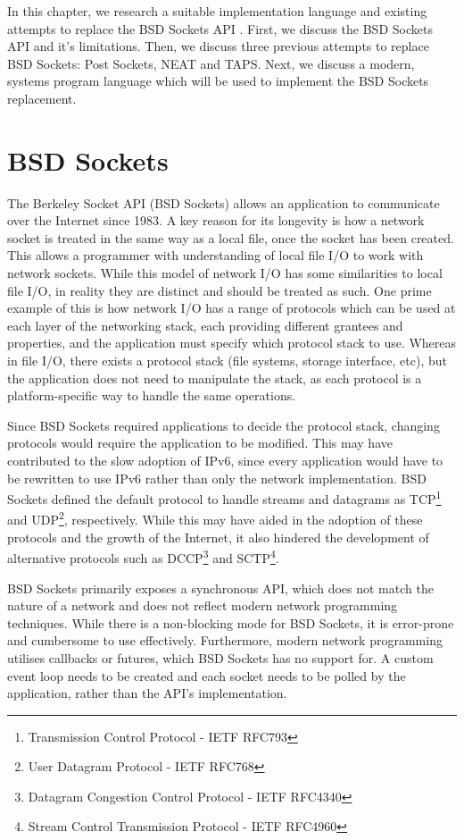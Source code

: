 In this chapter, we research a suitable implementation language and existing attempts to replace the BSD Sockets API .
First, we discuss the BSD Sockets API and it's limitations.
Then, we discuss three previous attempts to replace BSD Sockets: Post Sockets, NEAT and TAPS.
Next, we discuss a modern, systems program language which will be used to implement the BSD Sockets replacement.

\section{BSD Sockets}\label{sec:bsd-sockets}
The Berkeley Socket API (BSD Sockets) allows an application to communicate over the Internet since 1983.
A key reason for its longevity is how a network socket is treated in the same way as a local file, once the socket has
been created.
This allows a programmer with understanding of local file I/O to work with network sockets.
While this model of network I/O has some similarities to local file I/O, in reality they are distinct and should be
treated as such.
One prime example of this is how network I/O has a range of protocols which can be used at each layer of the networking
stack, each providing different grantees and properties, and the application must specify which protocol stack to use.
Whereas in file I/O, there exists a protocol stack (file systems, storage interface, etc), but the application does not
need to manipulate the stack, as each protocol is a platform-specific way to handle the same operations.

Since BSD Sockets required applications to decide the protocol stack, changing protocols would require the application
to be modified.
This may have contributed to the slow adoption of IPv6, since every application would have to be rewritten to use IPv6
rather than only the network implementation.
BSD Sockets defined the default protocol to handle streams and datagrams as
TCP\footnote{Transmission Control Protocol - IETF RFC793} and UDP\footnote{User Datagram Protocol - IETF RFC768},
respectively.
While this may have aided in the adoption of these protocols and the growth of the Internet, it also hindered the
development of alternative protocols such as DCCP\footnote{Datagram Congestion Control Protocol - IETF RFC4340} and
SCTP\footnote{Stream Control Transmission Protocol - IETF RFC4960}.

BSD Sockets primarily exposes a synchronous API, which does not match the nature of a network and does not reflect
modern network programming techniques.
While there is a non-blocking mode for BSD Sockets, it is error-prone and cumbersome to use effectively.
Furthermore, modern network programming utilises callbacks or futures, which BSD Sockets has no support for.
A custom event loop needs to be created and each socket needs to be polled by the application, rather than the API's
implementation.

